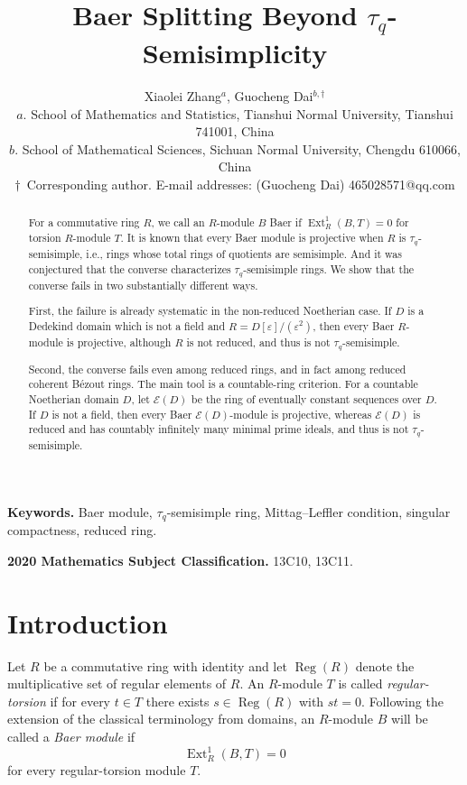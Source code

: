 \documentclass[11pt]{article}
\title{Baer Splitting Beyond $\tau_q$-Semisimplicity}
\author{Xiaolei Zhang$^{a}$,  Guocheng Dai$^{b,\dag}$\\
	\small $a.$ School of Mathematics and Statistics, Tianshui Normal University,
	Tianshui 741001, China\\	
	\small $b.$ School of Mathematical Sciences, Sichuan Normal University,
	Chengdu 610066, China\\
	\small $\dag$\ Corresponding author. E-mail addresses: (Guocheng Dai)  465028571@qq.com}
\theoremstyle{definition}
\theoremstyle{remark}
\newcommand{\Reg}{\operatorname{Reg}}
\newcommand{\Ext}{\operatorname{Ext}}
\newcommand{\EC}{\mathcal E}
\begin{document}
\maketitle
\begin{abstract}
For a commutative ring $R$, we call an $R$-module $B$ Baer if
$\Ext_R^1(B,T)=0$ for torsion $R$-module $T$.  It is known that every Baer module is
projective when $R$ is $\tau_q$-semisimple, i.e., rings whose total rings of quotients are semisimple. And it was conjectured that the
converse characterizes $\tau_q$-semisimple rings.  We show that the converse
fails in two substantially different ways.

First, the failure is already systematic in the non-reduced Noetherian case.
If $D$ is a Dedekind domain which is not a field and
$R=D[\varepsilon]/(\varepsilon^2)$, then every Baer $R$-module is projective,
although $R$ is not reduced, and thus is not $\tau_q$-semisimple.

Second, the converse fails even among reduced rings, and in fact among reduced
coherent B\'ezout rings.  The main tool is a countable-ring criterion. For a countable Noetherian domain $D$, let $\EC(D)$ be the ring of eventually
constant sequences over $D$.  If $D$ is not a field, then every Baer
$\EC(D)$-module is projective, whereas $\EC(D)$ is reduced and has countably
infinitely many minimal prime ideals, and thus is not $\tau_q$-semisimple.
\end{abstract}

\medskip
\noindent\textbf{Keywords.} Baer module,  $\tau_q$-semisimple ring, Mittag--Leffler condition, singular compactness, reduced ring.

\medskip
\noindent\textbf{2020 Mathematics Subject Classification.} 13C10, 13C11.
\maketitle

\section{Introduction}

Let $R$ be a commutative ring with identity and let $\Reg(R)$ denote the
multiplicative set of regular elements of $R$.  An $R$-module $T$ is called
\emph{regular-torsion} if for every $t\in T$ there exists $s\in\Reg(R)$ with
$st=0$.  Following the extension of the classical terminology from domains,
an $R$-module $B$ will be called a \emph{Baer module} if
\[
    \Ext_R^1(B,T)=0
\]
for every regular-torsion module $T$.
\end{document}
